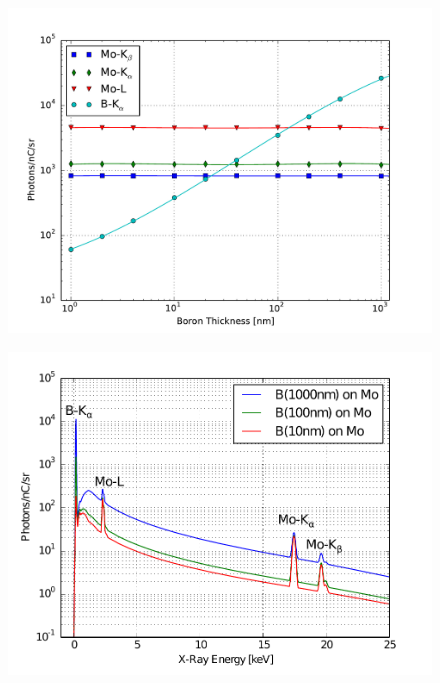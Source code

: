 \documentclass[12pt,letterpaper,final]{article}
\begin{document}
\begin{figure}[!h]
 \centering
  \includegraphics[width=\columnwidth]{figures/cModApplications/Boron_XRayIntensities.pdf}
 \caption{}
 \label{fig:Boron_XRayIntensities}
\end{figure}


\begin{figure}[!h]
 \centering
  \includegraphics[width=\columnwidth]{figures//cModApplications/BoronOnMoSpectra.pdf}
 \caption{}
 \label{fig:BoronOnMoSpectra}
\end{figure}
\end{document}
